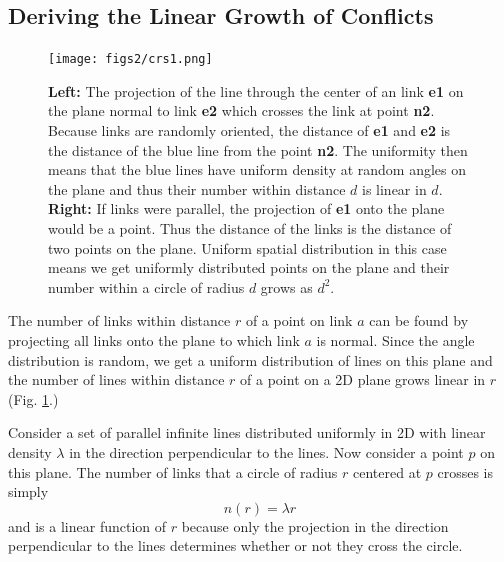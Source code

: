 \documentclass[linenumbers,endfloats,nofootinbib,preprint,floatfix,titlepage,superscriptaddress]{revtex4-1} %
\begin{document}
\subsection{Deriving the Linear Growth of Conflicts}

\begin{figure}
    \centering
    \texttt{[image: figs2/crs1.png]}
    \caption{\textbf{Left:} The projection of the line through the center of an link \textsf{\textbf{ e1}} on the plane normal to link \textsf{\textbf{ e2}} which crosses the link at point \textsf{\textbf{ n2}}. Because links are randomly oriented, the distance of \textsf{\textbf{ e1}} and \textsf{\textbf{ e2}} is the distance of the blue line from the point \textsf{\textbf{ n2}}. The uniformity then means that the blue lines have uniform density at random angles on the plane and thus their number within distance $d$ is linear in $d$. \textbf{Right:} If links were parallel, the projection of \textsf{\textbf{ e1}} onto the plane would be a point. Thus the distance of the links is the distance of two points on the plane. Uniform spatial distribution in this case means we get uniformly distributed points on the plane and their number within a circle of radius $d$ grows as $d^2$.}
    \label{fig:crs1}
\end{figure}

The number of links within distance $r$ of a point on link $a$  can be found by projecting all links onto the plane to which link $a$ is normal. 
Since the angle distribution is random, we get a uniform distribution of lines on this plane and the number of lines within distance $r$ of a point on a 2D plane grows linear in $r$ (Fig. \ref{fig:crs1}.)

Consider a set of parallel infinite lines distributed uniformly in 2D with linear density $\lambda$ in the direction perpendicular to the lines. Now consider a point $p$ on this plane. The number of links that a circle of radius $r$ centered at $p$ crosses is simply
\[n(r) = \lambda r \] 
and is a linear function of $r$ because only the projection in the direction perpendicular to the lines determines whether or not they cross the circle. 
\end{document}
